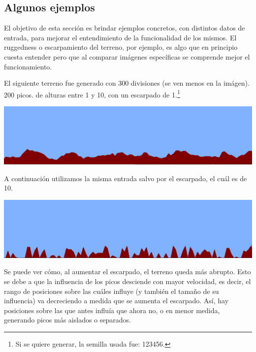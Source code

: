 \subsection{Algunos ejemplos}

El objetivo de esta sección es brindar ejemplos concretos, con distintos datos de entrada, para mejorar el entendimiento de la funcionalidad de los mismos. El ruggedness o escarpamiento del terreno, por ejemplo, es algo que en principio cuesta entender pero que al comparar imágenes específicas se comprende mejor el funcionamiento.

El siguiente terreno fue generado con 300 divisiones (se ven menos en la imágen). 200 picos. de alturas entre 1 y 10, con un escarpado de 1.\footnote{Si se quiere generar, la semilla usada fue: 123456.} 

\begin{center}
\includegraphics[scale=0.4]{imagenes/300-200-1-10-1-123456.png} 
\end{center}

A continuación utilizamos la misma entrada salvo por el escarpado, el cuál es de 10.

\begin{center}
\includegraphics[scale=0.4]{imagenes/300-200-1-10-10-123456.png} 
\end{center}

Se puede ver cómo, al aumentar el escarpado, el terreno queda más abrupto. Esto se debe a que la influencia de los picos desciende con mayor velocidad, es decir, el rango de posiciones sobre las cuáles influye (y también el tamaño de su influencia) va decreciendo a medida que se aumenta el escarpado. Así, hay posiciones sobre las que antes influía que ahora no, o en menor medida, generando picos más aislados o separados.

